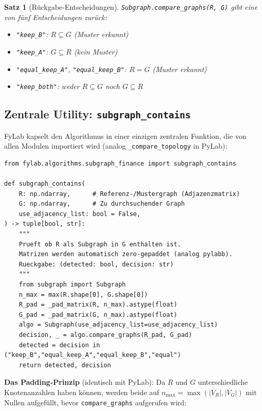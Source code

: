 \documentclass[a4paper,12pt]{article}
\newtheorem{satz}{Satz}
\begin{document}
\begin{satz}[Rückgabe-Entscheidungen]
    \texttt{Subgraph.compare\_graphs(R, G)} gibt eine von fünf
    Entscheidungen zurück:
    \begin{itemize}
        \item \texttt{"keep\_B"}: $R \subseteq G$ (Muster erkannt)
        \item \texttt{"keep\_A"}: $G \subseteq R$ (kein Muster)
        \item \texttt{"equal\_keep\_A"}, \texttt{"equal\_keep\_B"}: $R = G$ (Muster erkannt)
        \item \texttt{"keep\_both"}: weder $R \subseteq G$ noch $G \subseteq R$
    \end{itemize}
\end{satz}

\subsection{Zentrale Utility: \texttt{subgraph\_contains}}

FyLab kapselt den Algorithmus in einer einzigen zentralen Funktion,
die von allen Modulen importiert wird (analog \texttt{\_compare\_topology}
in PyLab):

\begin{lstlisting}[caption=subgraph\_contains -- zentraler Einstiegspunkt für alle Module]
from fylab.algorithms.subgraph_finance import subgraph_contains

def subgraph_contains(
    R: np.ndarray,      # Referenz-/Mustergraph (Adjazenzmatrix)
    G: np.ndarray,      # Zu durchsuchender Graph
    use_adjacency_list: bool = False,
) -> tuple[bool, str]:
    """
    Prueft ob R als Subgraph in G enthalten ist.
    Matrizen werden automatisch zero-gepaddet (analog pylabb).
    Rueckgabe: (detected: bool, decision: str)
    """
    from subgraph import Subgraph
    n_max = max(R.shape[0], G.shape[0])
    R_pad = _pad_matrix(R, n_max).astype(float)
    G_pad = _pad_matrix(G, n_max).astype(float)
    algo = Subgraph(use_adjacency_list=use_adjacency_list)
    decision, _ = algo.compare_graphs(R_pad, G_pad)
    detected = decision in ("keep_B","equal_keep_A","equal_keep_B","equal")
    return detected, decision
\end{lstlisting}

\textbf{Das Padding-Prinzip} (identisch mit PyLab): Da $R$ und $G$
unterschiedliche Knotenanzahlen haben können, werden beide auf
$n_{\max} = \max(|V_R|, |V_G|)$ mit Nullen aufgefüllt, bevor
\texttt{compare\_graphs} aufgerufen wird:
\end{document}
